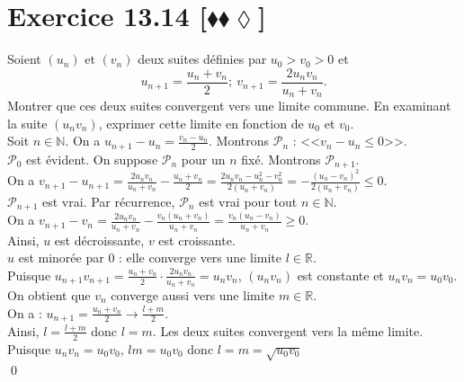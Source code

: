 \documentclass[10pt]{article}
\begin{document}
\section*{Exercice 13.14 [$\blacklozenge\blacklozenge\lozenge$]}
\begin{tcolorbox}[enhanced, width=7.6in, center, size=fbox, fontupper=\large, drop shadow southwest]
    Soient $(u_n)$ et $(v_n)$ deux suites définies par $u_0 > v_0 > 0$ et
    \begin{equation*}
        u_{n+1} = \frac{u_n + v_n}{2}; ~ v_{n+1} = \frac{2u_nv_n}{u_n + v_n}.
    \end{equation*}
    Montrer que ces deux suites convergent vers une limite commune. En examinant la suite $(u_nv_n)$, exprimer cette limite en fonction de $u_0$ et $v_0$.\\
    Soit $n\in\mathbb{N}$. On a $u_{n+1} - u_n = \frac{v_n - u_n}{2}$. Montrons $\mathcal{P}_n$ : <<$v_n-u_n \leq 0$>>.\\
    $\mathcal{P}_0$ est évident. On suppose $\mathcal{P}_n$ pour un $n$ fixé. Montrons $\mathcal{P}_{n+1}$.\\
    On a $v_{n+1} - u_{n+1} = \frac{2u_nv_n}{u_n+v_n} - \frac{u_n+v_n}{2} = \frac{2u_nv_n - u_n^2 - v_n^2}{2(u_n + v_n)}=-\frac{(u_n - v_n)^2}{2(u_n + v_n)}\leq0$.\\
    $\mathcal{P}_{n+1}$ est vrai. Par récurrence, $\mathcal{P}_n$ est vrai pour tout $n\in\mathbb{N}$.\\
    On a $v_{n+1} - v_n = \frac{2u_nv_n}{u_n+v_n} - \frac{v_n(u_n + v_n)}{u_n + v_n}=\frac{v_n(u_n - v_n)}{u_n + v_n}\geq0$.\\
    Ainsi, $u$ est décroissante, $v$ est croissante.\\
    $u$ est minorée par $0$ : elle converge vers une limite $l\in\mathbb{R}$.\\
    Puisque $u_{n+1}v_{n+1} = \frac{u_n+v_n}{2}\cdot\frac{2u_nv_n}{u_n+v_n}=u_nv_n$, $(u_nv_n)$ est constante et $u_nv_n = u_0v_0$.\\
    On obtient que $v_n$ converge aussi vers une limite $m\in\mathbb{R}$.\\
    On a : $u_{n+1} = \frac{u_n + v_n}{2} \longrightarrow \frac{l + m}{2}$.\\
    Ainsi, $l = \frac{l + m}{2}$ donc $l = m$. Les deux suites convergent vers la même limite.\\
    Puisque $u_nv_n = u_0v_0$, $lm = u_0v_0$ donc $l = m = \sqrt{u_0v_0}$\\
    \qed
\end{tcolorbox}
\end{document}

